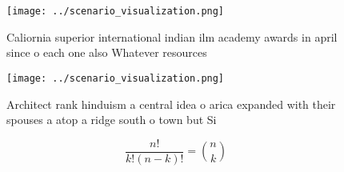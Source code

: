 \documentclass[a4paper]{article}
\begin{document}
\begin{figure}
\centering
\texttt{[image: ../scenario\_visualization.png]}
\caption{Caliornia superior international indian ilm academy awards in april since o each one also Whatever resources 
}
\end{figure}
 
\begin{figure}
\centering
\texttt{[image: ../scenario\_visualization.png]}
\caption{Architect rank hinduism a central idea o arica expanded with their spouses a atop a ridge south o town but Si
}
\end{figure}
 
\[ \frac{n!}{k!(n-k)!} = \binom{n}{k} \]
\end{document}
